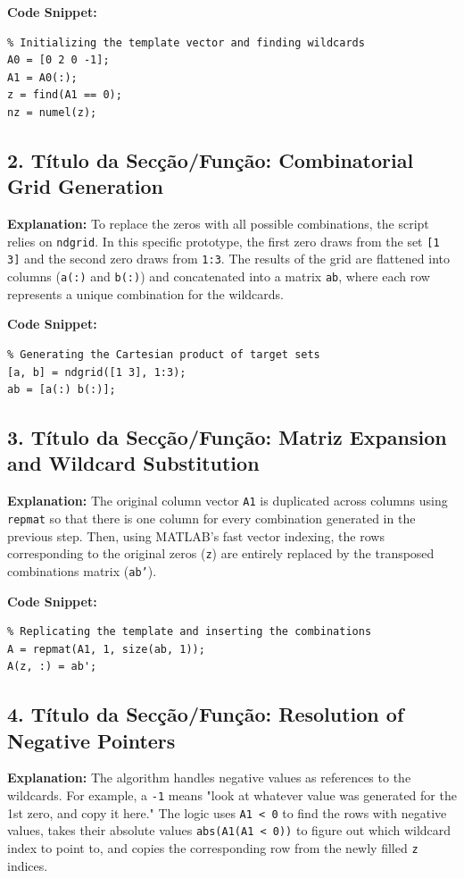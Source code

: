 \textbf{Code Snippet:}
\begin{lstlisting}
% Initializing the template vector and finding wildcards
A0 = [0 2 0 -1];
A1 = A0(:);
z = find(A1 == 0);
nz = numel(z);
\end{lstlisting}

\subsection{2. Título da Secção/Função: Combinatorial Grid Generation}
\textbf{Explanation:} 
To replace the zeros with all possible combinations, the script relies on \texttt{ndgrid}. In this specific prototype, the first zero draws from the set \texttt{[1 3]} and the second zero draws from \texttt{1:3}. The results of the grid are flattened into columns (\texttt{a(:)} and \texttt{b(:)}) and concatenated into a matrix \texttt{ab}, where each row represents a unique combination for the wildcards.

\textbf{Code Snippet:}
\begin{lstlisting}
% Generating the Cartesian product of target sets
[a, b] = ndgrid([1 3], 1:3);
ab = [a(:) b(:)];
\end{lstlisting}

\subsection{3. Título da Secção/Função: Matriz Expansion and Wildcard Substitution}
\textbf{Explanation:} 
The original column vector \texttt{A1} is duplicated across columns using \texttt{repmat} so that there is one column for every combination generated in the previous step. Then, using MATLAB's fast vector indexing, the rows corresponding to the original zeros (\texttt{z}) are entirely replaced by the transposed combinations matrix (\texttt{ab'}).

\textbf{Code Snippet:}
\begin{lstlisting}
% Replicating the template and inserting the combinations
A = repmat(A1, 1, size(ab, 1));
A(z, :) = ab';
\end{lstlisting}

\subsection{4. Título da Secção/Função: Resolution of Negative Pointers}
\textbf{Explanation:} 
The algorithm handles negative values as references to the wildcards. For example, a \texttt{-1} means "look at whatever value was generated for the 1st zero, and copy it here." The logic uses \texttt{A1 < 0} to find the rows with negative values, takes their absolute values \texttt{abs(A1(A1 < 0))} to figure out which wildcard index to point to, and copies the corresponding row from the newly filled \texttt{z} indices.

